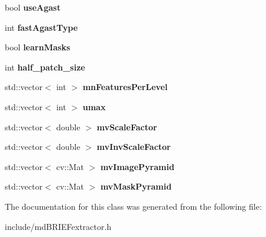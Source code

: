 \begin{DoxyCompactItemize}
\item 
bool {\bfseries use\+Agast}\hypertarget{classmdBRIEFextractor_a13804fd6cd95184e935c36fcea3bf19e}{}\label{classmdBRIEFextractor_a13804fd6cd95184e935c36fcea3bf19e}

\item 
int {\bfseries fast\+Agast\+Type}\hypertarget{classmdBRIEFextractor_affeccac13fe4a4981116a6d84f0759c3}{}\label{classmdBRIEFextractor_affeccac13fe4a4981116a6d84f0759c3}

\item 
bool {\bfseries learn\+Masks}\hypertarget{classmdBRIEFextractor_a2d879fa10c9b7798d47403d835890bb5}{}\label{classmdBRIEFextractor_a2d879fa10c9b7798d47403d835890bb5}

\item 
int {\bfseries half\+\_\+patch\+\_\+size}\hypertarget{classmdBRIEFextractor_a987a1f7a9beea23fe5eb3e6b731e70a2}{}\label{classmdBRIEFextractor_a987a1f7a9beea23fe5eb3e6b731e70a2}

\item 
std\+::vector$<$ int $>$ {\bfseries mn\+Features\+Per\+Level}\hypertarget{classmdBRIEFextractor_a25af3a314c66c461e893c9ade0a19d03}{}\label{classmdBRIEFextractor_a25af3a314c66c461e893c9ade0a19d03}

\item 
std\+::vector$<$ int $>$ {\bfseries umax}\hypertarget{classmdBRIEFextractor_aa491ccf730f1f2f9e69c800cb10f4f70}{}\label{classmdBRIEFextractor_aa491ccf730f1f2f9e69c800cb10f4f70}

\item 
std\+::vector$<$ double $>$ {\bfseries mv\+Scale\+Factor}\hypertarget{classmdBRIEFextractor_a090e0df687a8e2ee205c79cad9add39b}{}\label{classmdBRIEFextractor_a090e0df687a8e2ee205c79cad9add39b}

\item 
std\+::vector$<$ double $>$ {\bfseries mv\+Inv\+Scale\+Factor}\hypertarget{classmdBRIEFextractor_af8987cf35f38bc905262d2d8fc9619c0}{}\label{classmdBRIEFextractor_af8987cf35f38bc905262d2d8fc9619c0}

\item 
std\+::vector$<$ cv\+::\+Mat $>$ {\bfseries mv\+Image\+Pyramid}\hypertarget{classmdBRIEFextractor_ab1b14557a72b264db8da1298042acf95}{}\label{classmdBRIEFextractor_ab1b14557a72b264db8da1298042acf95}

\item 
std\+::vector$<$ cv\+::\+Mat $>$ {\bfseries mv\+Mask\+Pyramid}\hypertarget{classmdBRIEFextractor_a8973c00c2a0f709ade7ea3f0cfc86a6f}{}\label{classmdBRIEFextractor_a8973c00c2a0f709ade7ea3f0cfc86a6f}

\end{DoxyCompactItemize}


The documentation for this class was generated from the following file\+:\begin{DoxyCompactItemize}
\item 
include/md\+B\+R\+I\+E\+Fextractor.\+h\end{DoxyCompactItemize}
